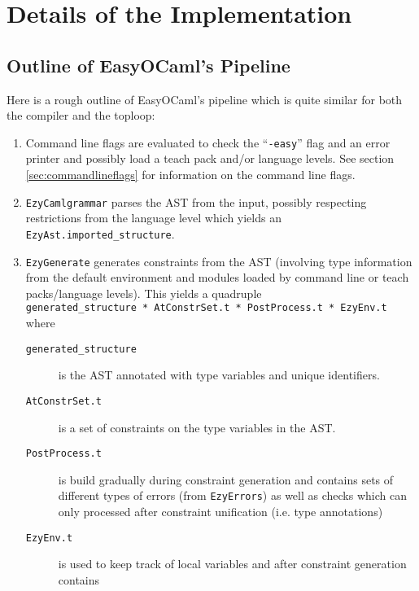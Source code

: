 
\section{Details of the Implementation}

\label{impldets}

\subsection{Outline of EasyOCaml's Pipeline}

Here is a rough outline of EasyOCaml's pipeline which is quite similar 
for both the compiler and the toploop:

\begin{enumerate}
    \item \label{steps} Command line flags are evaluated to check 
        the ``\texttt{-easy}'' flag and an error printer and possibly load a
        teach pack and/or language levels. See section
        \ref{sec:commandlineflags} for information on the command line flags.
    \item \texttt{EzyCamlgrammar} parses the AST from the input, 
        possibly respecting restrictions from the language level which 
        yields an \texttt{EzyAst.imported\_structure}.
    \item \texttt{EzyGenerate} generates constraints from the AST 
        (involving type information from the default environment and 
        modules loaded by command line or teach packs/language levels).  
        This yields a quadruple 
        \texttt{generated\_structure~*~AtConstrSet.t~*~PostProcess.t~*~EzyEnv.t} 
        where
        \begin{description}
            \item[\texttt{generated\_structure}] is the AST 
                annotated with type variables and unique identifiers.
            \item[\texttt{AtConstrSet.t}] is a set of constraints on 
                the type variables in the AST.
            \item[\texttt{PostProcess.t}] is build gradually during 
                constraint generation and contains sets of different 
                types of errors (from \texttt{EzyErrors}) as well as 
                checks which can only processed after constraint 
                unification (i.e. type annotations)
            \item[\texttt{EzyEnv.t}] is used to keep track of local 
                variables and after constraint generation contains 

\end{description}
\end{enumerate}
